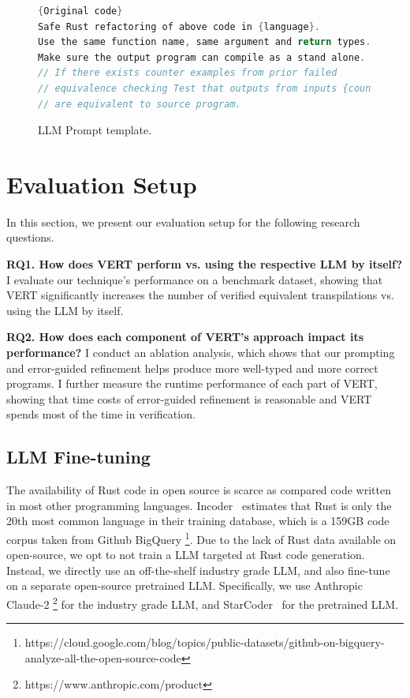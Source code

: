\documentclass[12pt,openany,oneside,table]{cmuthesis}
\begin{document}
\begin{figure}
\centering
\begin{lstlisting}[numbersep=5pt,xleftmargin=21pt,numberstyle=\scriptsize,basicstyle=\footnotesize\ttfamily,firstnumber=1, language=C]
{Original code}
Safe Rust refactoring of above code in {language}.
Use the same function name, same argument and return types.
Make sure the output program can compile as a stand alone.
// If there exists counter examples from prior failed 
// equivalence checking Test that outputs from inputs {counter_examples} 
// are equivalent to source program.
\end{lstlisting}
\caption{\small LLM Prompt template.}
\label{code:prompt}
\vspace*{-5mm}
\end{figure}


\section{Evaluation Setup}
\label{section:eval}

In this section, we present our evaluation setup for the following research questions.

\noindent\textbf{RQ1. How does VERT perform vs. using the respective LLM by itself?}
I evaluate our technique's performance on a benchmark dataset,
showing that VERT significantly increases the number of verified equivalent transpilations vs. using the LLM by itself.

\noindent\textbf{RQ2. How does each component of VERT's approach impact its performance?}
I conduct an ablation analysis, which shows that our prompting and
error-guided refinement helps produce more well-typed and more correct
programs.
I further measure the runtime performance of each part of VERT, showing that
time costs of error-guided refinement is reasonable and VERT
spends most of the time in verification. 

\subsection{LLM Fine-tuning}
The availability of Rust code in open source is scarce as compared code written in most other programming languages. Incoder~\cite{fried2022incoder} estimates that Rust is only the 20th most common language in their training database, which is a 159GB code corpus taken from Github BigQuery \footnote{https://cloud.google.com/blog/topics/public-datasets/github-on-bigquery-analyze-all-the-open-source-code}. Due to the lack of Rust data available on open-source, we opt to not train a LLM targeted at Rust code generation. Instead, we directly use an off-the-shelf industry grade LLM, and also fine-tune on a separate open-source pretrained LLM. Specifically, we use Anthropic Claude-2 \footnote{https://www.anthropic.com/product} for the industry grade LLM, and StarCoder~\cite{li2023starcoder} for the pretrained LLM. 
\end{document}

